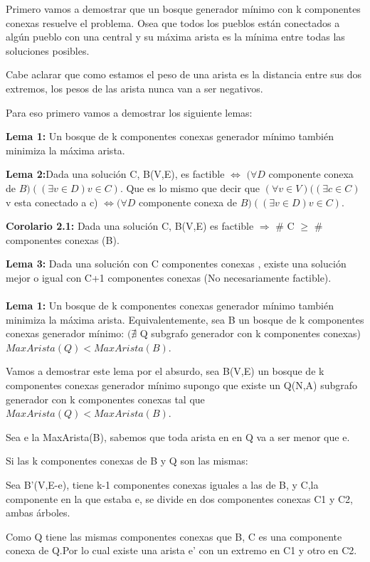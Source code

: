 Primero vamos a demostrar que un bosque generador mínimo con k componentes conexas resuelve el problema. Osea que todos los pueblos están conectados a algún pueblo con una central y su máxima arista es la mínima entre todas las soluciones posibles.

Cabe aclarar que como estamos el peso de una arista es la distancia entre sus dos extremos, los pesos de las arista nunca van a ser negativos.

Para eso primero vamos a demostrar los siguiente lemas:

\textbf{Lema 1:} Un bosque de k componentes conexas generador mínimo también minimiza la máxima arista.

\textbf{Lema 2:}Dada una solución C, B(V,E), es factible $\Longleftrightarrow$ $(\forall D$ componente conexa de $B)((\exists v \in D) v \in C)$. Que es lo mismo que decir que $(\forall v \in V)((\exists c \in C)$ v esta conectado a c) $\Leftrightarrow (\forall D$ componente conexa de $B)((\exists v \in D) v \in C)$.

\textbf{Corolario 2.1:} Dada una solución C, B(V,E) es factible $\Rightarrow$ \# C $\geq$ \# componentes conexas (B).

\textbf{Lema 3:} Dada una solución con C componentes conexas , existe una solución mejor o igual con C+1 componentes conexas (No necesariamente factible). \\ \\ 


\textbf{Lema 1:} Un bosque de k componentes conexas generador mínimo también minimiza la máxima arista. Equivalentemente, sea B un bosque de k componentes conexas generador mínimo: $(\nexists$ Q subgrafo generador con k componentes conexas) $MaxArista(Q) < MaxArista(B)$.

Vamos a demostrar este lema por el absurdo, sea B(V,E) un bosque de k componentes conexas generador mínimo supongo que existe un Q(N,A) subgrafo generador con k componentes conexas tal que $MaxArista(Q) < MaxArista(B)$.

Sea e la MaxArista(B), sabemos que toda arista en en Q va a ser menor que e.

Si las k componentes conexas de B y Q son las mismas:

Sea B'(V,E-e), tiene k-1 componentes conexas iguales a las de B, y C,la componente en la que estaba e, se divide en dos componentes conexas C1 y C2, ambas árboles.

Como Q tiene las mismas componentes conexas que B, C es una componente conexa de Q.Por lo cual existe una arista e' con un extremo en C1 y otro en C2.

